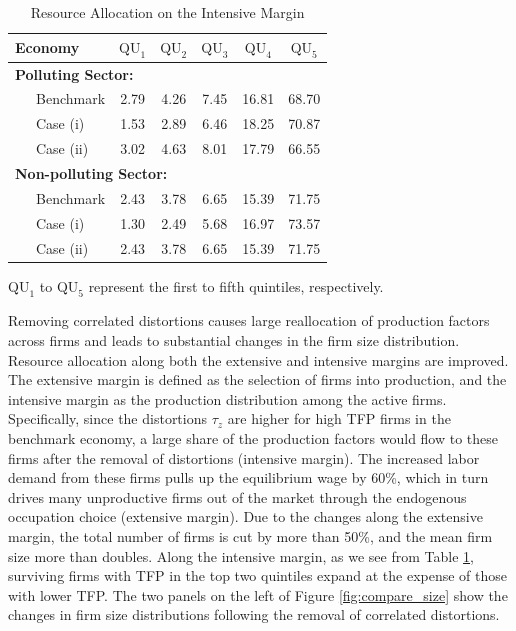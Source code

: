 \documentclass[AEJ]{AEA}
\begin{document}
\begin{table}[t]
\footnotesize
\centering
\caption{Resource Allocation on the Intensive Margin}
\begin{tabular}{lccccc}
    \hline \hline
    Economy           & $\text{QU}_1$ & $\text{QU}_2$ & $\text{QU}_3$ & $\text{QU}_4$ & $\text{QU}_5$ \\
    \hline
    \multicolumn{3}{l}{\textbf{Polluting Sector:}} \\
    \ \ \ Benchmark   & 2.79          & 4.26          & 7.45          & 16.81         & 68.70          \\
    \ \ \ Case (i)    & 1.53          & 2.89          & 6.46          & 18.25         & 70.87          \\
    \ \ \ Case (ii)   & 3.02          & 4.63          & 8.01          & 17.79         & 66.55          \\
    \hline
    \multicolumn{3}{l}{\textbf{Non-polluting Sector:}} \\
    \ \ \ Benchmark   & 2.43          & 3.78          & 6.65          & 15.39         & 71.75          \\
    \ \ \ Case (i)    & 1.30          & 2.49          & 5.68          & 16.97         & 73.57          \\
    \ \ \ Case (ii)   & 2.43          & 3.78          & 6.65          & 15.39         & 71.75          \\
    \hline
\end{tabular}
\begin{tablenotes}
     $\text{QU}_1$ to $\text{QU}_5$ represent the first to fifth quintiles, respectively.
\end{tablenotes}
\label{tab:talentdist}
\end{table}

Removing correlated distortions causes large reallocation of production factors across firms and leads to substantial changes in the firm size distribution. Resource allocation along both the extensive and intensive margins are improved. The {extensive} margin is defined as the selection of firms into production, and the {intensive} margin as the production distribution among the active firms. Specifically, since the distortions $\tau_z$ are higher for high TFP firms in the benchmark economy, a large share of the production factors would flow to these firms after the removal of distortions (intensive margin). The increased labor demand from these firms pulls up the equilibrium wage by 60\%, which in turn drives many unproductive firms out of the market through the endogenous occupation choice (extensive margin). Due to the changes along the extensive margin, the total number of firms is cut by more than 50\%, and the mean firm size more than doubles. Along the intensive margin, as we see from Table \ref{tab:talentdist}, surviving firms with TFP in the top two quintiles expand at the expense of those with lower TFP. The two panels on the left of Figure \ref{fig:compare_size} show the changes in firm size distributions following the removal of correlated distortions.
\end{document}
